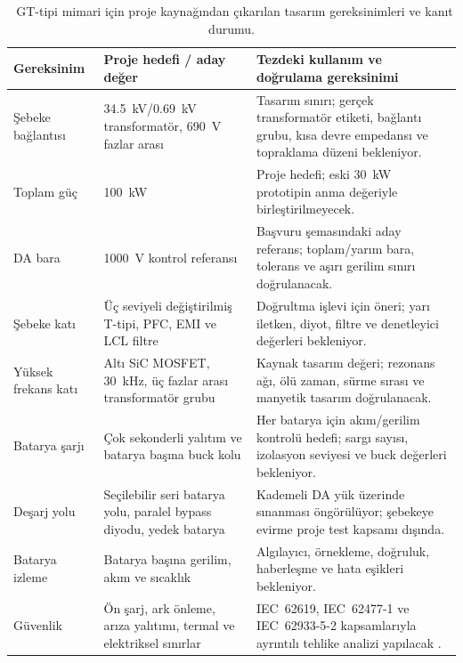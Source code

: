 \begin{table}[htbp]
  \centering
  \caption{\diskaynaketiketi\ GT-tipi mimari için proje kaynağından çıkarılan tasarım gereksinimleri ve kanıt durumu.}
  \label{tab:gt-tasarim-gereksinimleri}
  \small
  \begin{tabularx}{\textwidth}{@{}p{}p{}X@{}}
    \toprule
    Gereksinim & Proje hedefi / aday değer & Tezdeki kullanım ve doğrulama gereksinimi \\
    \midrule
    Şebeke bağlantısı & \SI{34.5}{\kilo\volt}/\SI{0.69}{\kilo\volt} transformatör, \SI{690}{\volt} fazlar arası & Tasarım sınırı; gerçek transformatör etiketi, bağlantı grubu, kısa devre empedansı ve topraklama düzeni bekleniyor. \\
    Toplam güç & \SI{100}{\kilo\watt} & Proje hedefi; eski \SI{30}{\kilo\watt} prototipin anma değeriyle birleştirilmeyecek. \\
    DA bara & \SI{1000}{\volt} kontrol referansı & Başvuru şemasındaki aday referans; toplam/yarım bara, tolerans ve aşırı gerilim sınırı doğrulanacak. \\
    Şebeke katı & Üç seviyeli değiştirilmiş T-tipi, PFC, EMI ve LCL filtre & Doğrultma işlevi için öneri; yarı iletken, diyot, filtre ve denetleyici değerleri bekleniyor. \\
    Yüksek frekans katı & Altı SiC MOSFET, \SI{30}{\kilo\hertz}, üç fazlar arası transformatör grubu & Kaynak tasarım değeri; rezonans ağı, ölü zaman, sürme sırası ve manyetik tasarım doğrulanacak. \\
    Batarya şarjı & Çok sekonderli yalıtım ve batarya başına buck kolu & Her batarya için akım/gerilim kontrolü hedefi; sargı sayısı, izolasyon seviyesi ve buck değerleri bekleniyor. \\
    Deşarj yolu & Seçilebilir seri batarya yolu, paralel bypass diyodu, yedek batarya & Kademeli DA yük üzerinde sınanması öngörülüyor; şebekeye evirme proje test kapsamı dışında. \\
    Batarya izleme & Batarya başına gerilim, akım ve sıcaklık & Algılayıcı, örnekleme, doğruluk, haberleşme ve hata eşikleri bekleniyor. \\
    Güvenlik & Ön şarj, ark önleme, arıza yalıtımı, termal ve elektriksel sınırlar & IEC~62619, IEC~62477-1 ve IEC~62933-5-2 kapsamlarıyla ayrıntılı tehlike analizi yapılacak \citep{IEC62619,IEC62477,IEC62933_5_2}. \\
    \bottomrule
  \end{tabularx}
\end{table}


